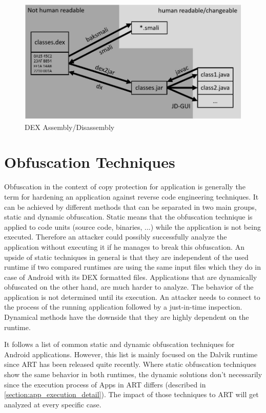 \begin{figure}[htb]
  \includegraphics[width=\textwidth]{figures/dex_disassembly}
  \caption[DEX Assembly/Disassembly]{DEX Assembly/Disassembly}
  \label{fig:dex_disassembly}
\end{figure}


\section{Obfuscation Techniques}\label{section:obfuscation_techniques}
Obfuscation in the context of copy protection for application
is generally the term for hardening an application against
reverse code engineering techniques. It can be achieved by different methods
that can be separated in two main groups, static and dynamic obfuscation.
Static means that the obfuscation technique is applied to code units (source
code, binaries, ...) while the application is not being executed. Therefore an
attacker could possibly successfully analyze the application without executing it if he manages to break this obfuscation. An upside of static techniques in general is that they are independent of the used runtime if two compared runtimes are using the same input files which they do in case of Android with
its DEX formatted files.
Applications that are dynamically obfuscated on the other hand, are much harder to analyze. The behavior
of the application is not determined until its execution. An attacker needs to connect to the process of the running application followed by a just-in-time inspection. Dynamical methods have the downside that they are highly dependent on the runtime.

It follows a list of common static and dynamic obfuscation techniques
for Android applications. However, this list is mainly focused on
the Dalvik runtime since ART has been released quite recently.
Where static obfuscation techniques show the same behavior in both
runtimes, the dynamic solutions don't necessarily since the execution process
of Apps in ART differs (described in \autoref{section:app_execution_detail}).
The impact of those techniques to ART will get analyzed at every specific case.


